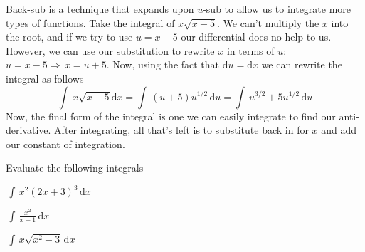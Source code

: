 \documentclass[addpoints]{exam}
\theoremstyle{definition}
\theoremstyle{plain}
\begin{document}
\newpage 
\begin{tcolorbox}[breakable, title=\subsection{BACK SUB}, colframe=black, sharp corners, colback=Azure4!30, colbacktitle=Plum2!80, coltitle=black]
    Back-sub is a technique that expands upon $u$-sub to allow us to integrate more types of functions. Take the integral of $x\sqrt{x-5}$. We can't multiply the $x$ into the root, and if we try to use $u=x-5$ our differential does no help to us. However, we can use our substitution to rewrite $x$ in terms of $u$: $u=x-5\Rightarrow\,x=u+5$. Now, using the fact that $\mathrm{d}u=\mathrm{d}x$ we can rewrite the integral as follows
    \[
        \int\,x\sqrt{x-5}\mathrm{d}x = \int\,\left(u+5\right)u^{1/2}\,\mathrm{d}u = \int\,u^{3/2}+5u^{1/2}\,\mathrm{d}u
    \]
    Now, the final form of the integral is one we can easily integrate to find our anti-derivative. After integrating, all that's left is to substitute back in for $x$ and add our constant of integration. 
\end{tcolorbox}
Evaluate the following integrals
\begin{questions}
    \question $\displaystyle\,\int\,x^2\left(2x+3\right)^{3}\,\mathrm{d}x$
    
    \question $\displaystyle\,\int\,\frac{x^2}{x+1}\,\mathrm{d}x$
    
    \question $\displaystyle\,\int\,x\sqrt{x^2-3}\,\mathrm{d}x$
\end{questions}

\newpage 
\end{document}
